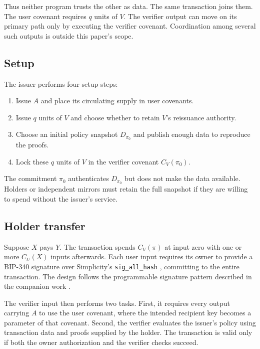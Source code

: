 \documentclass[11pt]{article}
\begin{document}
    Thus neither program trusts the other as data.
    The same transaction joins them.
    The user covenant requires $q$ units of $V$.
    The verifier output can move on its primary path only by executing the verifier covenant.
    Coordination among several such outputs is outside this paper's scope.

    \subsection{Setup}

    The issuer performs four setup steps:

    \begin{enumerate}
        \item Issue $A$ and place its circulating supply in user covenants.
        \item Issue $q$ units of $V$ and choose whether to retain $V$'s reissuance authority.
        \item Choose an initial policy snapshot $D_{\pi_0}$ and publish enough data to reproduce the proofs.
        \item Lock these $q$ units of $V$ in the verifier covenant $C_V(\pi_0)$.
    \end{enumerate}

    The commitment $\pi_0$ authenticates $D_{\pi_0}$ but does not make the data available.
    Holders or independent mirrors must retain the full snapshot if they are willing to spend without the issuer's service.

    \subsection{Holder transfer}

    Suppose $X$ pays $Y$.
    The transaction spends $C_V(\pi)$ at input zero with one or more $C_U(X)$ inputs afterwards.
    Each user input requires its owner to provide a BIP-340 signature over Simplicity's \texttt{sig\_all\_hash} \cite{bip340,simplicity-sighash}, committing to the entire transaction.
    The design follows the programmable signature pattern described in the companion work \cite{programmable-signatures}.

    The verifier input then performs two tasks.
    First, it requires every output carrying $A$ to use the user covenant, where the intended recipient key becomes a parameter of that covenant.
    Second, the verifier evaluates the issuer's policy using transaction data and proofs supplied by the holder.
    The transaction is valid only if both the owner authorization and the verifier checks succeed.
\end{document}
